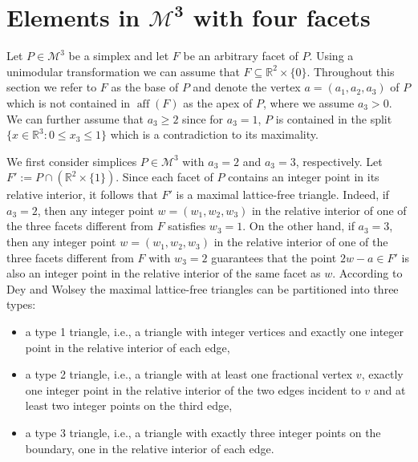 \documentclass[a4paper]{article}
\theoremstyle{plain}
\begin{document}
\section{Elements in $\boldsymbol{\mathcal{M}^3}$ with four facets} \label{four.facets}

Let $P \in {\mathcal{M}^3}$ be a simplex and let $F$ be an arbitrary
facet of $P$.
Using a unimodular transformation we can assume that $F
\subseteq {\mathbb{R}}^2 \times \{0\}$.
Throughout this section we refer to $F$ as the base of $P$
and denote the vertex $a = (a_1, a_2, a_3)$ of $P$ which is
not contained in ${{\mathop{\mathrm{{aff}}}}}(F)$ as the apex of $P$, where we
assume $a_3 > 0$.
We can further assume that $a_3 \geq 2$ since for $a_3 = 1$,
$P$ is contained in the split $\{x \in {\mathbb{R}}^3 : 0 \leq x_3
\leq 1\}$ which is a contradiction to its maximality.

We first consider simplices $P \in {\mathcal{M}^3}$ with $a_3 = 2$ and
$a_3 = 3$, respectively.
Let $F':= P \cap ({\mathbb{R}}^2 \times \{1\})$.
Since each facet of $P$ contains an integer point in its
relative interior, it follows that $F'$ is a maximal
lattice-free triangle.
Indeed, if $a_3 = 2$, then any integer point $w =
(w_1,w_2,w_3)$ in the relative interior of one of the three
facets different from $F$ satisfies $w_3 = 1$.
On the other hand, if $a_3 = 3$, then any integer point
$w = (w_1,w_2,w_3)$ in the relative interior of one of the
three facets different from $F$ with $w_3 = 2$ guarantees
that the point $2w - a \in F'$ is also an integer point in
the relative interior of the same facet as $w$.
According to Dey and Wolsey \cite{DeyWolsey08} the maximal
lattice-free triangles can be partitioned into three types:
\begin{itemize}
  \item a type 1 triangle, i.e., a triangle with integer
    vertices and exactly one integer point in the relative
    interior of each edge,
  \item a type 2 triangle, i.e., a triangle with at least
    one fractional vertex $v$, exactly one integer point in
    the relative interior of the two edges incident to $v$
    and at least two integer points on the third edge,
  \item a type 3 triangle, i.e., a triangle with exactly
    three integer points on the boundary, one in the
    relative interior of each edge.
\end{itemize}
\end{document}
